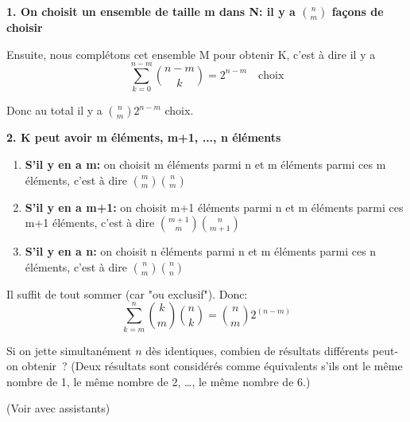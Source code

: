 \vspace{1cm}

\textbf{1. On choisit un ensemble de taille m dans N: il y a ${n \choose m}$ façons de choisir}

Ensuite, nous complétons cet ensemble M pour obtenir K, c'est à dire il y a $$\sum_{k=0}^{n-m} {n-m \choose k} = 2^{n-m} \quad \text{choix}$$ 

Donc au total il y a ${n \choose m} 2^{n-m}$ choix.

\textbf{2. K peut avoir m éléments, m+1, ..., n éléments} 

\begin{enumerate}
\item \textbf{S'il y en a m:} on choisit m éléments parmi n et m éléments parmi ces m éléments, c'est à dire ${m \choose m}{n \choose m}$
\item \textbf{S'il y en a m+1:} on choisit m+1 éléments parmi n et m éléments parmi ces m+1 éléments, c'est à dire ${m+1 \choose m}{n \choose m+1}$
\item \textbf{S'il y en a n:} on choisit n éléments parmi n et m éléments parmi ces n éléments, c'est à dire ${n \choose m}{n \choose n}$ 
\end{enumerate}

Il suffit de tout sommer (car "ou exclusif"). Donc: $$ \sum_{k=m}^n {k \choose m}{n \choose k} = {n \choose m} 2^{(n-m)}$$

\vspace{1cm}


\begin{exo} 
Si on jette simultan\'ement $n$ d\`es identiques, combien de r\'esultats diff\'erents peut-on obtenir~? (Deux r\'esultats sont consid\'er\'es comme \'equivalents s'ils ont le m\^eme nombre de 1, le m\^eme nombre de 2, \ldots, le m\^eme nombre de 6.)
\end{exo}

(Voir avec assistants)